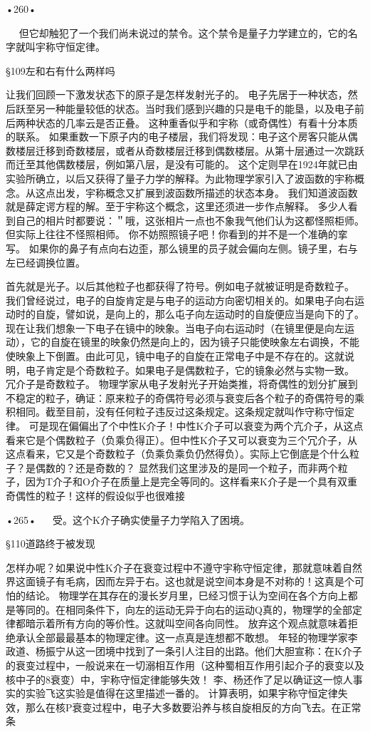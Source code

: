 •260•
  





  
但它却触犯了一个我们尚未说过的禁令。这个禁令是量子力学建立的，它的名字就叫宇称守恒定律。

§109左和右有什么两样吗

让我们回顾一下激发状态下的原子是怎样发射光子的。
电子先居于一种状态，然后跃至另一种能量较低的状态。当时我们感到兴趣的只是电千的能垦，以及电子前后两种状态的几率云是否正叠。
这种重香似乎和宇称（或奇偶性）有看十分本质的联系。
如果重数一下原子内的电子楼层，我们将发现：电子这个房客只能从偶数楼层迁移到奇数楼层，或者从奇数楼层迁移到偶数楼层。从第十层通过一次跳跃而迁至其他偶数楼层，例如第八层，是没有可能的。
这个定则早在1924年就已由实验所确立，以后又获得了量子力学的解释。为此物理学家引入了波函数的宇称概念。从这点出发，宇称概念又扩展到波函数所描述的状态本身。
我们知道波函数就是薛定谔方程的解。至于宇称这个概念，这里还须进一步作点解释。
多少人看到自己的相片时都要说：＂哦，这张相片一点也不象我气他们认为这都怪照柜师。但实际上往往不怪照相师。
你不妨照照镜子吧！你看到的并不是一个准确的挛写。
如果你的鼻子有点向右边歪，那么镜里的员子就会偏向左侧。镜子里，右与左已经调换位置。
 
首先就是光子。以后其他粒子也都获得了符号。例如电子就被证明是奇数粒子。
我们曾经说过，电子的自旋肯定是与电子的运动方向密切相关的。如果电子向右运动时的自旋，譬如说，是向上的，那么屯子向左运动时的自旋便应当是向下的了。现在让我们想象一下电子在镜中的映象。当电子向右运动时（在镜里便是向左运动），它的自旋在镜里的映象仍然是向上的，因为镜子只能使映象左右调换，不能使映象上下倒置。由此可见，镜中电子的自旋在正常电子中是不存在的。这就说明，电子肯定是个奇数粒子。如果电子是偶数粒子，它的镜象必然与实物一致。
冗介子是奇数粒子。
物理学家从电子发射光子开始类推，将奇偶性的划分扩展到不稳定的粒子，确证：原来粒子的奇偶符号必须与衰变后各个粒子的奇偶符号的乘积相同。截至目前，没有任何粒子违反过这条规定。这条规定就叫作守称守恒定律。
可是现在偏偏出了个中性K介子！中性K介子可以衰变为两个亢介子，从这点看来它是个偶数粒子（负乘负得正）。但中性K介子又可以衰变为三个冗介子，从这点看来，它又是个奇数粒子（负乘负乘负仍然得负）。实际上它倒底是个什么粒子？是偶数的？还是奇数的？
显然我们这里涉及的是同一个粒子，而非两个粒子，因为T介子和O介子在质量上是完全等同的。这样看来K介子是一个具有双重奇偶性的粒子！这样的假设似乎也很难接

•265•
  
受。这个K介子确实使量子力学陷入了困境。

§110道路终于被发现

怎样办呢？如果说中性K介子在衰变过程中不遵守宇称守恒定律，那就意味着自然界这面镜子有毛病，因而左异于右。这也就是说空间本身是不对称的！这真是个可怕的结论。
物理学在其存在的漫长岁月里，巳经习惯于认为空间在各个方向上都是等同的。在相同条件下，向左的运动无异于向右的运动Q真的，物理学的全部定律都暗示着所有方向的等价性。这就叫空间各向同性。
放弃这个观点就意味着拒绝承认全部最最基本的物理定律。这一点真是连想都不敢想。
年轻的物理学家李政道、杨振宁从这一团境中找到了一条引人注目的出路。他们大胆宣称：在K介子的衰变过程中，一般说来在一切溺相互作用（这种蜀相互作用引起介子的衰变以及核中子的8衰变）中，宇称守恒定律能够失效！
李、杨还作了足以确证这一惊人事实的实验飞这实验是值得在这里描述一番的。
计算表明，如果宇称守恒定律失效，那么在核P衰变过程中，电子大多数要沿养与核自旋相反的方向飞去。在正常条

